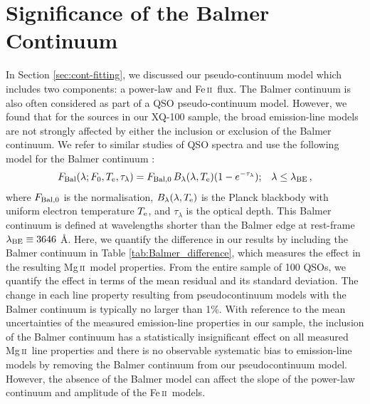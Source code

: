 \documentclass[fleqn,usenatbib]{mnras}
\newcommand{\mgii}{Mg\,\textsc{ii}}
\newcommand{\feii}{Fe\,\textsc{ii}}
\begin{document}
\section{Significance of the Balmer Continuum} \label{sec:appendix-Balmer}
In Section \ref{sec:cont-fitting}, we discussed our pseudo-continuum model which includes two components: a power-law and \feii\ flux. The Balmer continuum is also often considered as part of a QSO pseudo-continuum model. However, we found that for the sources in our XQ-100 sample, the broad emission-line models are not strongly affected by either the inclusion or exclusion of the Balmer continuum. We refer to similar studies of QSO spectra and use the following model for the Balmer continuum \citep[e.g.,][]{Grandi_1982, Dietrich_2002, Wang_2009, Kovacevic_2014}:
\begin{equation}
\begin{aligned}
        F_{\rm{Bal}}(\lambda; F_{\rm{0}}, T_{\rm{e}}, \tau_{\lambda}) = F_{\rm{Bal,0}} \, B_{\lambda}(\lambda, T_{\rm{e}})(1-e^{-\tau_{\lambda}}); && \lambda \leq \lambda_{\rm{BE}}\,,
\end{aligned}
\end{equation}
where $F_{\rm{Bal, 0}}$ is the normalisation, $B_{\lambda}(\lambda, T_{\rm{e}})$ is the Planck blackbody with uniform electron temperature $T_{\rm{e}}$, and $\tau_{\lambda}$ is the optical depth. This Balmer continuum is defined at wavelengths shorter than the Balmer edge at rest-frame $\lambda_{\rm{BE}} \equiv 3646$ \AA. Here, we quantify the difference in our results by including the Balmer continuum in Table \ref{tab:Balmer_difference}, which measures the effect in the resulting \mgii\ model properties. From the entire sample of 100 QSOs, we quantify the effect in terms of the mean residual and its standard deviation. The change in each line property resulting from pseudocontinuum models with the Balmer continuum is typically no larger than 1\%. With reference to the mean uncertainties of the measured emission-line properties in our sample, the inclusion of the Balmer continuum has a statistically insignificant effect on all measured \mgii\ line properties and there is no observable systematic bias to emission-line models by removing the Balmer continuum from our pseudocontinuum model. However, the absence of the Balmer model can affect the slope of the power-law continuum and amplitude of the \feii\ models.
\end{document}
